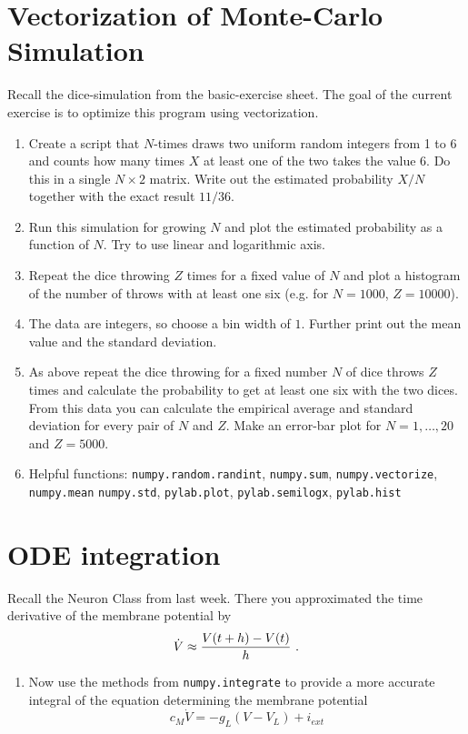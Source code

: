 \documentclass[smallheadings,12pt]{scrartcl}
\begin{document}
\section{Vectorization of Monte-Carlo Simulation}
Recall the dice-simulation from the basic-exercise sheet. The goal of
the current exercise is to optimize this program using vectorization.
\begin{enumerate}
\item Create a script that $N$-times draws two uniform random integers
  from 1 to 6 and counts how many times $X$ at least one of the two takes
  the value 6. Do this
  in a single $N\times 2$ matrix.  Write out the estimated probability
  $X/N$ together with the exact result $11/36$.
\item Run this simulation for growing $N$ and plot the estimated probability as a
  function of $N$. Try to use linear and logarithmic axis.
\item Repeat the dice throwing $Z$ times for a fixed value of $N$ and
plot a histogram of the number of throws with at  least one six (e.g. for $N=1000$, $Z=10000$). 
\item The data are integers, so choose a bin width of $1$. Further print out the mean value and the standard deviation.
\item As above repeat the dice throwing for a fixed number $N$ of dice throws $Z$ times and calculate the probability 
to get at least one six with the two dices. From this data you can calculate the empirical average and standard 
deviation for every pair of $N$ and $Z$. Make an error-bar plot for $N=1,\ldots,20$ and $Z=5000$.

\item[] Helpful functions: {\tt numpy.random.randint}, {\tt numpy.sum}, {\tt numpy.vectorize}, {\tt numpy.mean}
{\tt numpy.std}, {\tt pylab.plot}, {\tt pylab.semilogx}, {\tt pylab.hist}
\end{enumerate}

\section{ODE integration}
Recall the Neuron Class from last week. There you approximated the time derivative of the membrane potential by
\[ \dot{V}\approx\frac{V(t+h)-V(t)}{h} \textup{ .} \]
\begin{enumerate}
 \item Now use the methods from {\tt numpy.integrate} to provide a more accurate integral of the equation determining 
the membrane potential
\[c_{M}\dot{V}=-g_{L}\left(V-V_{L}\right)+i_{ext}\]

 \end{enumerate}
\end{document}
